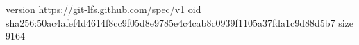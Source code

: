version https://git-lfs.github.com/spec/v1
oid sha256:50ac4afef4d4614f8cc9f05d8e9785e4c4cab8c0939f1105a37fda1c9d88d5b7
size 9164
